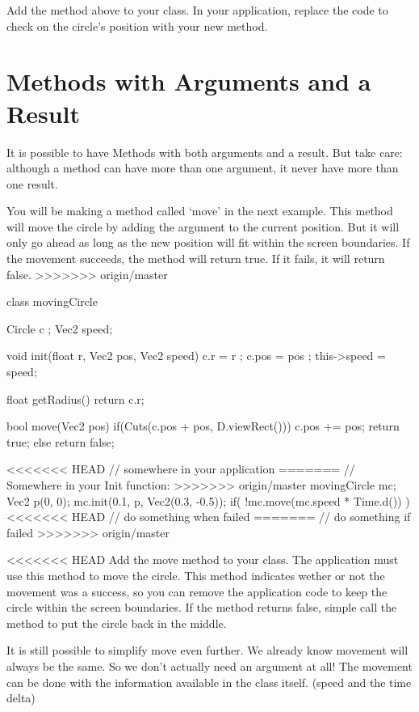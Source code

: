 \begin{exercise}
Add the method above to your class. In your application, replace the code to check on the circle's position with your new method.
\end{exercise}

\section{Methods with Arguments and a Result}
It is possible to have Methods with both arguments and a result. But take care: although a method can have more than one argument, it never have more than one result.

You will be making a method called `move' in the next example. This method will move the circle by adding the argument to the current position. But it will only go ahead as long as the new position will fit within the screen boundaries. If the movement succeeds, the method will return true. If it fails, it will return false.
>>>>>>> origin/master

\begin{code}
class movingCircle {
  Circle c    ;
  Vec2   speed;
  
  void init(float r, Vec2 pos, Vec2 speed) {
    c.r         = r    ;
    c.pos       = pos  ;
    this->speed = speed;
  }
  
  float getRadius() {
    return c.r;
  }
  
  bool move(Vec2 pos) {
    if(Cuts(c.pos + pos, D.viewRect())) {
      c.pos += pos;
      return true;
    } else {
      return false;
    }
  }
}

<<<<<<< HEAD
// somewhere in your application
=======
// Somewhere in your Init function:
>>>>>>> origin/master
movingCircle mc;
Vec2 p(0, 0);
mc.init(0.1, p, Vec2(0.3, -0.5));
if( !mc.move(mc.speed * Time.d()) ) {
<<<<<<< HEAD
  // do something when failed
=======
  // do something if failed
>>>>>>> origin/master
}
\end{code}

\begin{exercise}
<<<<<<< HEAD
Add the move method to your class. The application must use this method to move the circle. This method indicates wether or not the movement was a success, so you can remove the application code to keep the circle within the screen boundaries. If the method returns false, simple call the  method to put the circle back in the middle.

It is still possible to simplify move even further. We already know movement will always be the same. So we don't actually need an argument at all! The movement can be done with the information available in the class itself. (speed and the time delta)
\end{exercise}

